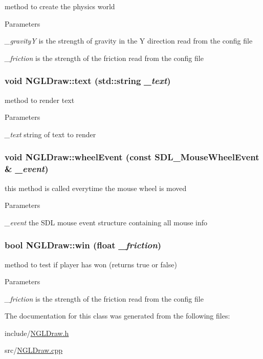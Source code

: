 method to create the physics world 
\begin{DoxyParams}{Parameters}
\item[{\em \_\-gravityY}]is the strength of gravity in the Y direction read from the config file \item[{\em \_\-friction}]is the strength of the friction read from the config file \end{DoxyParams}
\hypertarget{classNGLDraw_a1019ca5abe411c3111cbe3f77e8218b6}{
\subsubsection[{text}]{\setlength{\rightskip}{0pt plus 5cm}void NGLDraw::text (std::string {\em \_\-text})}}
\label{classNGLDraw_a1019ca5abe411c3111cbe3f77e8218b6}


method to render text 
\begin{DoxyParams}{Parameters}
\item[{\em \_\-text}]string of text to render \end{DoxyParams}
\hypertarget{classNGLDraw_a8782a682c3a362baa3b18882f49c95ed}{
\subsubsection[{wheelEvent}]{\setlength{\rightskip}{0pt plus 5cm}void NGLDraw::wheelEvent (const SDL\_\-MouseWheelEvent \& {\em \_\-event})}}
\label{classNGLDraw_a8782a682c3a362baa3b18882f49c95ed}


this method is called everytime the mouse wheel is moved 
\begin{DoxyParams}{Parameters}
\item[{\em \_\-event}]the SDL mouse event structure containing all mouse info \end{DoxyParams}
\hypertarget{classNGLDraw_a973c98c0b531ffb824913d6753948508}{
\subsubsection[{win}]{\setlength{\rightskip}{0pt plus 5cm}bool NGLDraw::win (float {\em \_\-friction})}}
\label{classNGLDraw_a973c98c0b531ffb824913d6753948508}


method to test if player has won (returns true or false) 
\begin{DoxyParams}{Parameters}
\item[{\em \_\-friction}]is the strength of the friction read from the config file \end{DoxyParams}


The documentation for this class was generated from the following files:\begin{DoxyCompactItemize}
\item 
include/\hyperlink{NGLDraw_8h}{NGLDraw.h}\item 
src/\hyperlink{NGLDraw_8cpp}{NGLDraw.cpp}\end{DoxyCompactItemize}
